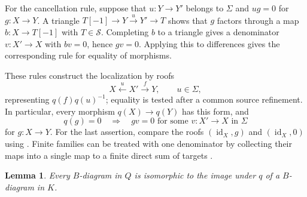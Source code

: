 \documentclass[11pt]{article}
\numberwithin{equation}{section}
\newtheorem{lemma}[theorem]{Lemma}
\theoremstyle{definition}
\theoremstyle{remark}
\DeclareMathOperator{\id}{id}
\begin{document}
For the cancellation rule, suppose that $u:Y\to Y'$ belongs to
$\Sigma$ and $ug=0$ for $g:X\to Y$.
A triangle $T[-1]\to Y\xrightarrow{u}Y'\to T$ shows that $g$
factors through a map $b:X\to T[-1]$ with $T\in\mathcal S$.
Completing $b$ to a triangle gives a denominator $v:X'\to X$
with $bv=0$, hence $gv=0$.  Applying this to differences gives
the corresponding rule for equality of morphisms.

These rules construct the localization by roofs
\[
  X\xleftarrow{u}X'\xrightarrow{f}Y,
  \qquad u\in\Sigma,
\]
representing $q(f)q(u)^{-1}$; equality is tested after a common source
refinement. In particular, every morphism $q(X)\to q(Y)$ has this
form, and
\begin{equation}\label{eq:zero-fraction}
  q(g)=0\quad\Longrightarrow\quad
  gv=0\text{ for some }v:X'\to X\text{ in }\Sigma
\end{equation}
for $g:X\to Y$. For the last assertion, compare the roofs
$(\id_X,g)$ and $(\id_X,0)$ using \cite[Tag 04VJ]{StacksProject}.
Finite families can be treated with one denominator by collecting
their maps into a single map to a finite direct sum of targets
\cite[Tag 04VI]{StacksProject}.

\begin{lemma}\label{lem:diagram-lift}
Every $B$-diagram in $Q$ is isomorphic to the image under $q$ of a
$B$-diagram in $K$.
\end{lemma}
\end{document}
